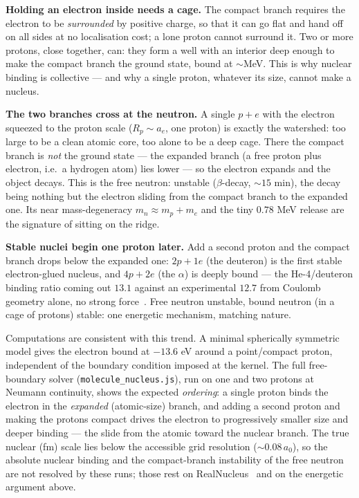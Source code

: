 \documentclass[11pt]{article}
\begin{document}
\textbf{Holding an electron inside needs a cage.} The compact branch requires the electron to be \emph{surrounded}
by positive charge, so that it can go flat and hand off on all sides at no localisation cost; a lone proton cannot
surround it. Two or more protons, close together, can: they form a well with an interior deep enough to make the
compact branch the ground state, bound at ${\sim}$MeV. This is why nuclear binding is collective --- and why a
single proton, whatever its size, cannot make a nucleus.

\textbf{The two branches cross at the neutron.} A single $p+e$ with the electron squeezed to the proton scale
($R_p\sim a_e$, one proton) is exactly the watershed: too large to be a clean atomic core, too alone to be a deep
cage. There the compact branch is \emph{not} the ground state --- the expanded branch (a free proton plus electron,
i.e.\ a hydrogen atom) lies lower --- so the electron expands and the object decays. This is the free neutron:
unstable ($\beta$-decay, ${\sim}15$ min), the decay being nothing but the electron sliding from the compact branch
to the expanded one. Its near mass-degeneracy $m_n\approx m_p+m_e$ and the tiny $0.78$ MeV release are the
signature of sitting on the ridge.

\textbf{Stable nuclei begin one proton later.} Add a second proton and the compact branch drops below the expanded
one: $2p+1e$ (the deuteron) is the first stable electron-glued nucleus, and $4p+2e$ (the $\alpha$) is deeply bound
--- the He-4/deuteron binding ratio coming out $13.1$ against an experimental $12.7$ from Coulomb geometry alone,
no strong force~\cite{realnucleus}. Free neutron unstable, bound neutron (in a cage of protons) stable: one
energetic mechanism, matching nature.

Computations are consistent with this trend. A minimal spherically symmetric model gives the electron bound at
$-13.6$ eV around a point/compact proton, independent of the boundary condition imposed at the kernel. The full
free-boundary solver (\texttt{molecule\_nucleus.js}), run on one and two protons at Neumann continuity, shows the
expected \emph{ordering}: a single proton binds the electron in the \emph{expanded} (atomic-size) branch, and
adding a second proton and making the protons compact drives the electron to progressively smaller size and deeper
binding --- the slide from the atomic toward the nuclear branch. The true nuclear (fm) scale lies below the
accessible grid resolution (${\sim}0.08\,a_0$), so the absolute nuclear binding and the compact-branch instability
of the free neutron are not resolved by these runs; those rest on RealNucleus~\cite{realnucleus} and on the
energetic argument above.
\end{document}
